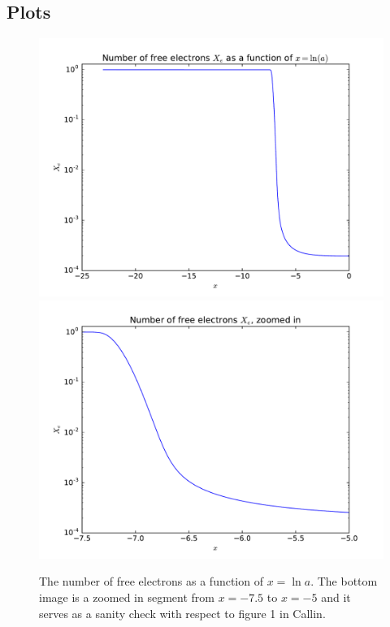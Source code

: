 \documentclass[12pt]{article}
\begin{document}
\subsection*{Plots}
\begin{figure}[H]
\centering
\includegraphics[width=0.8\linewidth]{Plots/ElectronNumber.pdf}
\includegraphics[width=0.8\linewidth]{Plots/ElectronNumberZoomed.pdf}
\caption{The number of free electrons as a function of $x=\ln a$. The bottom image is a zoomed in segment from $x=-7.5$ to $x=-5$ and it serves as a sanity check with respect to figure 1 in Callin.}
\end{figure}
\end{document}
